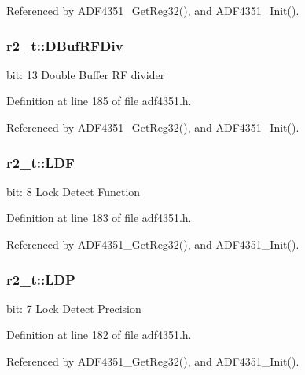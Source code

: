 Referenced by A\+D\+F4351\+\_\+\+Get\+Reg32(), and A\+D\+F4351\+\_\+\+Init().

\subsubsection[{\texorpdfstring{D\+Buf\+R\+F\+Div}{DBufRFDiv}}]{ r2\+\_\+t\+::\+D\+Buf\+R\+F\+Div}\hypertarget{structr2__t_a14726d1cf923d8e12279cd3038fa0540}{}\label{structr2__t_a14726d1cf923d8e12279cd3038fa0540}
bit\+: 13 Double Buffer RF divider 

Definition at line 185 of file adf4351.\+h.



Referenced by A\+D\+F4351\+\_\+\+Get\+Reg32(), and A\+D\+F4351\+\_\+\+Init().

\subsubsection[{\texorpdfstring{L\+DF}{LDF}}]{ r2\+\_\+t\+::\+L\+DF}\hypertarget{structr2__t_a42f019ff5be1600c098175eb64ab55da}{}\label{structr2__t_a42f019ff5be1600c098175eb64ab55da}
bit\+: 8 Lock Detect Function 

Definition at line 183 of file adf4351.\+h.



Referenced by A\+D\+F4351\+\_\+\+Get\+Reg32(), and A\+D\+F4351\+\_\+\+Init().

\subsubsection[{\texorpdfstring{L\+DP}{LDP}}]{ r2\+\_\+t\+::\+L\+DP}\hypertarget{structr2__t_a406cd49f63cb56882de02e7fe2ace6bf}{}\label{structr2__t_a406cd49f63cb56882de02e7fe2ace6bf}
bit\+: 7 Lock Detect Precision 

Definition at line 182 of file adf4351.\+h.



Referenced by A\+D\+F4351\+\_\+\+Get\+Reg32(), and A\+D\+F4351\+\_\+\+Init().

